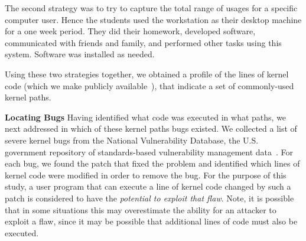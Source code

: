 The second strategy was to try to capture the total range of usages for a
specific computer user. Hence the students used the workstation as their
desktop machine for a one week period. They did their homework, developed
software, communicated with friends and family, and performed
other tasks using this system. Software was installed as needed.

Using these two strategies together, we obtained a profile of the lines of
kernel code (which we make publicly available~), that indicate
a set of commonly-used kernel paths.



\textbf{Locating Bugs}
Having identified what code was executed in what paths, we next addressed in
which of these kernel paths bugs existed. We collected a list of
severe kernel bugs from the National Vulnerability Database, the U.S.
government repository of standards-based vulnerability management
data~\cite{NVD}. For each bug, we
found the patch that fixed the problem and identified
which lines of kernel code were modified in order to remove the bug.
For the purpose of this study, a user program that can execute a line of kernel
code changed by such a patch is considered to have the \textit{potential to
exploit that flaw}.  Note, it is possible that in some situations this may
overestimate the ability for an attacker to exploit a flaw, since it may be
possible that additional lines of code must also be executed.


